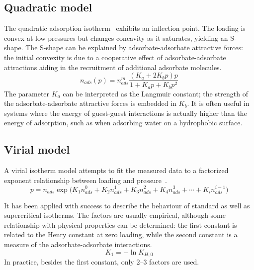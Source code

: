 \subsection{Quadratic model}\label{pyg:models:quadratic}

The quadratic adsorption
isotherm~\cite{hillIntroductionStatisticalThermodynamics1986}
exhibits an inflection point. The loading is convex at low
pressures but changes concavity as it saturates, yielding
an S-shape. The S-shape can be explained by adsorbate-adsorbate
attractive forces: the initial convexity is due to a cooperative
effect of adsorbate-adsorbate attractions aiding in the recruitment
of additional adsorbate molecules.
%
\begin{equation}\label{pyg:eqn:quad}
	n_{ads}(p) = n_{ads}^m \frac{(K_a + 2 K_b p)p}{1+K_{a} p + K_{b} p^2}
\end{equation}
%
The parameter \(K_a\) can be interpreted as the Langmuir constant;
the strength of the adsorbate-adsorbate attractive forces is
embedded in \(K_b\). It is often useful in systems where the
energy of guest-guest interactions is actually higher than
the energy of adsorption, such as when adsorbing water
on a hydrophobic surface.

\subsection{Virial model}\label{pyg:models:virial}

A virial isotherm model attempts to fit the measured data to a
factorized exponent relationship between loading and
pressure~\cite{myersThermodynamicsAdsorptionPorous2002}.
%
\begin{equation}\label{pyg:eqn:virial}
	p = n_{ads} \exp{\big(K_1n_{ads}^0 + K_2n_{ads}^1 + K_3n_{ads}^2 + K_4n_{ads}^3 + 
	\cdots + K_i n_{ads}^{i-1}\big)}
\end{equation}

It has been applied with success to describe the behaviour of
standard as well as supercritical isotherms. The factors are
usually empirical, although some relationship with physical
properties can be determined:
the first constant is related to the Henry constant at
zero loading, while the second constant is a measure of the
adsorbate-adsorbate interactions.
%
\begin{equation}
	K_1 = -\ln{K_{H,0}}
\end{equation}
%
In practice, besides the first constant, only 2--3 factors are used.

